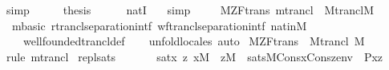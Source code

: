 \begin{isabellebody}
\ simp\isanewline
\ \ \isamarkupfalse%
\ \isamarkupfalse%
\ {\isacharquery}{\kern0pt}thesis\isanewline
\ \ \ \ \isamarkupfalse%
\ {\isacartoucheopen}nat{\isasymsubseteq}I{\isacartoucheclose}\ {}\ \isamarkupfalse%
\ simp\isanewline
{}\isamarkupfalse%
%
\endisatagproof
{\isafoldproof}%
%
\isadelimproof
\isanewline
%
\endisadelimproof
\ \ \isanewline
\isanewline
\isanewline
{}\isamarkupfalse%
\ {\isacharparenleft}{\kern0pt}\ M{\isacharunderscore}{\kern0pt}ZF{\isacharunderscore}{\kern0pt}trans{\isacharparenright}{\kern0pt}\ mtrancl\ {\isacharcolon}{\kern0pt}\ {\isachardoublequoteopen}M{\isacharunderscore}{\kern0pt}trancl{\isacharparenleft}{\kern0pt}{\isacharhash}{\kern0pt}{\isacharhash}{\kern0pt}M{\isacharparenright}{\kern0pt}{\isachardoublequoteclose}\isanewline
%
\isadelimproof
\ \ %
\endisadelimproof
%
\isatagproof
{}\isamarkupfalse%
\ \ mbasic\ rtrancl{\isacharunderscore}{\kern0pt}separation{\isacharunderscore}{\kern0pt}intf\ wftrancl{\isacharunderscore}{\kern0pt}separation{\isacharunderscore}{\kern0pt}intf\ nat{\isacharunderscore}{\kern0pt}in{\isacharunderscore}{\kern0pt}M\isanewline
\ \ \ \ wellfounded{\isacharunderscore}{\kern0pt}trancl{\isacharunderscore}{\kern0pt}def\isanewline
\ \ \isamarkupfalse%
\ unfold{\isacharunderscore}{\kern0pt}locales\ auto%
\endisatagproof
{\isafoldproof}%
%
\isadelimproof
\isanewline
%
\endisadelimproof
\isanewline
{}\isamarkupfalse%
\ M{\isacharunderscore}{\kern0pt}ZF{\isacharunderscore}{\kern0pt}trans\ {\isasymsubseteq}\ M{\isacharunderscore}{\kern0pt}trancl\ {\isachardoublequoteopen}{\isacharhash}{\kern0pt}{\isacharhash}{\kern0pt}M{\isachardoublequoteclose}\isanewline
%
\isadelimproof
\ \ %
\endisadelimproof
%
\isatagproof
{}\isamarkupfalse%
\ {\isacharparenleft}{\kern0pt}rule\ mtrancl{\isacharparenright}{\kern0pt}%
\endisatagproof
{\isafoldproof}%
%
\isadelimproof
%
\endisadelimproof
%
\isadelimdocument
%
\endisadelimdocument
%
\isatagdocument
%
\isamarkuptrue%
%
\endisatagdocument
{\isafolddocument}%
%
\isadelimdocument
%
\endisadelimdocument
{}\isamarkupfalse%
\ repl{\isacharunderscore}{\kern0pt}sats{\isacharcolon}{\kern0pt}\isanewline
\ \ \isanewline
\ \ \ \ sat{\isacharcolon}{\kern0pt}{\isachardoublequoteopen}{\isasymAnd}x\ z{\isachardot}{\kern0pt}\ x{\isasymin}M\ {\isasymLongrightarrow}\ z{\isasymin}M\ {\isasymLongrightarrow}\ sats{\isacharparenleft}{\kern0pt}M{\isacharcomma}{\kern0pt}{\isasymphi}{\isacharcomma}{\kern0pt}Cons{\isacharparenleft}{\kern0pt}x{\isacharcomma}{\kern0pt}Cons{\isacharparenleft}{\kern0pt}z{\isacharcomma}{\kern0pt}env{\isacharparenright}{\kern0pt}{\isacharparenright}{\kern0pt}{\isacharparenright}{\kern0pt}\ {\isasymlongleftrightarrow}\ P{\isacharparenleft}{\kern0pt}x{\isacharcomma}{\kern0pt}z{\isacharparenright}{\kern0pt}{\isachardoublequoteclose}\isanewline

\end{isabellebody}
